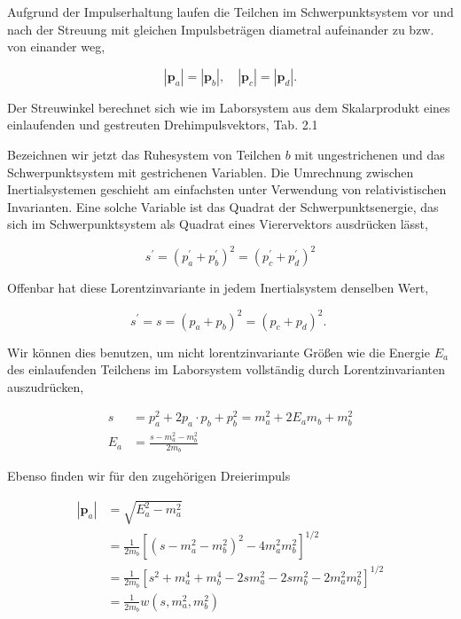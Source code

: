 \documentclass[10pt, letterpaper]{article}
\begin{document}
Aufgrund der Impulserhaltung laufen die Teilchen im Schwerpunktsystem vor und nach der Streuung mit gleichen Impulsbeträgen diametral aufeinander zu bzw. von einander weg,

$$
\left|\mathbf{p}_{a}\right|=\left|\mathbf{p}_{b}\right|, \quad\left|\mathbf{p}_{c}\right|=\left|\mathbf{p}_{d}\right| .
$$

Der Streuwinkel berechnet sich wie im Laborsystem aus dem Skalarprodukt eines einlaufenden und gestreuten Drehimpulsvektors, Tab. 2.1

Bezeichnen wir jetzt das Ruhesystem von Teilchen $b$ mit ungestrichenen und das Schwerpunktsystem mit gestrichenen Variablen. Die Umrechnung zwischen Inertialsystemen geschieht am einfachsten unter Verwendung von relativistischen Invarianten. Eine solche Variable ist das Quadrat der Schwerpunktsenergie, das sich im Schwerpunktsystem als Quadrat eines Vierervektors ausdrücken lässt,

$$
s^{\prime}=\left(p_{a}^{\prime}+p_{b}^{\prime}\right)^{2}=\left(p_{c}^{\prime}+p_{d}^{\prime}\right)^{2}
$$

Offenbar hat diese Lorentzinvariante in jedem Inertialsystem denselben Wert,

$$
s^{\prime}=s=\left(p_{a}+p_{b}\right)^{2}=\left(p_{c}+p_{d}\right)^{2} \text {. }
$$

Wir können dies benutzen, um nicht lorentzinvariante Größen wie die Energie $E_{a}$ des einlaufenden Teilchens im Laborsystem vollständig durch Lorentzinvarianten auszudrücken,

$$
\begin{aligned}
s & =p_{a}^{2}+2 p_{a} \cdot p_{b}+p_{b}^{2}=m_{a}^{2}+2 E_{a} m_{b}+m_{b}^{2} \\
E_{a} & =\frac{s-m_{a}^{2}-m_{b}^{2}}{2 m_{b}}
\end{aligned}
$$

Ebenso finden wir für den zugehörigen Dreierimpuls

$$
\begin{aligned}
\left|\mathbf{p}_{a}\right| & =\sqrt{E_{a}^{2}-m_{a}^{2}} \\
& =\frac{1}{2 m_{b}}\left[\left(s-m_{a}^{2}-m_{b}^{2}\right)^{2}-4 m_{a}^{2} m_{b}^{2}\right]^{1 / 2} \\
& =\frac{1}{2 m_{b}}\left[s^{2}+m_{a}^{4}+m_{b}^{4}-2 s m_{a}^{2}-2 s m_{b}^{2}-2 m_{a}^{2} m_{b}^{2}\right]^{1 / 2} \\
& =\frac{1}{2 m_{b}} w\left(s, m_{a}^{2}, m_{b}^{2}\right)
\end{aligned}
$$
\end{document}
